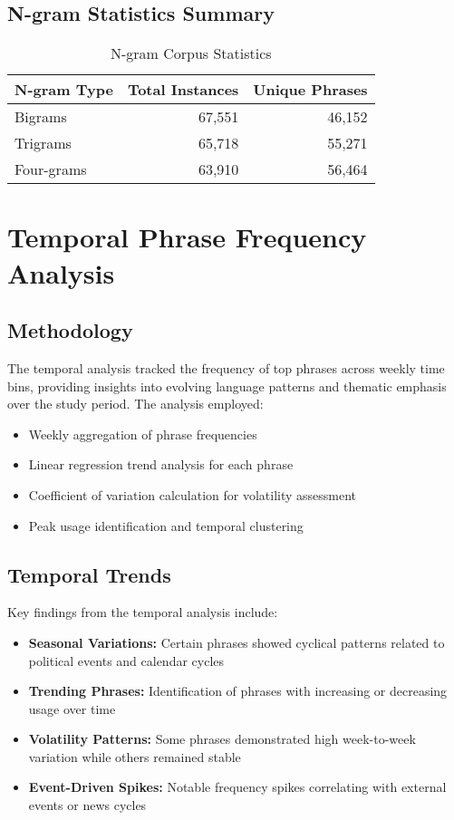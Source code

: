 \documentclass[12pt,a4paper]{article}
\begin{document}
\subsection{N-gram Statistics Summary}

\begin{table}[h!]
\centering
\caption{N-gram Corpus Statistics}
\begin{tabular}{@{}lrr@{}}
\toprule
\textbf{N-gram Type} & \textbf{Total Instances} & \textbf{Unique Phrases} \\
\midrule
Bigrams & 67,551 & 46,152 \\
Trigrams & 65,718 & 55,271 \\
Four-grams & 63,910 & 56,464 \\
\bottomrule
\end{tabular}
\end{table}

\section{Temporal Phrase Frequency Analysis}

\subsection{Methodology}

The temporal analysis tracked the frequency of top phrases across weekly time bins, providing insights into evolving language patterns and thematic emphasis over the study period. The analysis employed:

\begin{itemize}
    \item Weekly aggregation of phrase frequencies
    \item Linear regression trend analysis for each phrase
    \item Coefficient of variation calculation for volatility assessment
    \item Peak usage identification and temporal clustering
\end{itemize}

\subsection{Temporal Trends}

Key findings from the temporal analysis include:

\begin{itemize}
    \item \textbf{Seasonal Variations:} Certain phrases showed cyclical patterns related to political events and calendar cycles
    \item \textbf{Trending Phrases:} Identification of phrases with increasing or decreasing usage over time
    \item \textbf{Volatility Patterns:} Some phrases demonstrated high week-to-week variation while others remained stable
    \item \textbf{Event-Driven Spikes:} Notable frequency spikes correlating with external events or news cycles
\end{itemize}
\end{document}
